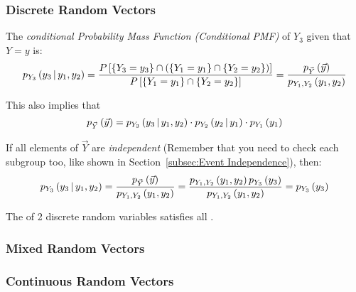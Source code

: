 		\subsubsection{Discrete Random Vectors} \label{subsubsec:Conditional Probability Discrete Random Vectors}
			\begin{definition} \label{def:Discrete Random Vector-Conditional PMF}
				The \emph{conditional Probability Mass Function (Conditional PMF)} of $Y_{3}$ given that $Y=y$ is:
				\begin{equation} \label{eq:Discrete Random Vector-Conditional PMF}
					p_{Y_{3}} \left( y_{3} \operatorname{\vert} y_{1},y_{2} \right)
					= \frac{P \left[ \lbrace Y_{3}=y_{3} \rbrace \cap \left( \lbrace Y_{1}=y_{1} \rbrace \cap \lbrace Y_{2}=y_{2} \rbrace \right) \right]}{P \left[ \lbrace Y_{1}=y_{1} \rbrace \cap \lbrace Y_{2}=y_{2} \rbrace \right]} 
					= \frac{p_{\vec{Y}} \left( \vec{y} \right)}{p_{Y_{1},Y_{2}} \left( y_{1},y_{2} \right)}
				\end{equation}
				\begin{remark}
					This also implies that
					\begin{equation} \label{eq:Discrete Random Vector-Joint PMF}
						p_{\vec{Y}} \left( \vec{y} \right) = p_{Y_{3}} \left( y_{3} \operatorname{\vert} y_{1},y_{2} \right) \cdot p_{Y_{2}} \left( y_{2} \operatorname{\vert} y_{1} \right) \cdot p_{Y_{1}} \left( y_{1} \right)
					\end{equation}
				\end{remark}
				\begin{remark}
					If all elements of $\vec{Y}$ are \emph{independent} (Remember that you need to check each subgroup too, like shown in Section~\ref{subsec:Event Independence}), then:
					\begin{equation} \label{eq:Discrete Random Vector-Independent Conditional PMF}
						p_{Y_{3}} \left( y_{3} \operatorname{\vert} y_{1},y_{2} \right)
						= \frac{p_{\vec{Y}} \left( \vec{y} \right)}{p_{Y_{1},Y_{2}} \left( y_{1},y_{2} \right)}
						= \frac{p_{Y_{1},Y_{2}} \left( y_{1},y_{2} \right) p_{Y_{3}} \left( y_{3} \right)}{p_{Y_{1},Y_{2}} \left( y_{1},y_{2} \right)}
						= p_{Y_{3}} \left( y_{3} \right)
					\end{equation}
				\end{remark}
				\begin{remark}
					The  of 2 discrete random variables satisfies all .
				\end{remark}
			\end{definition}
		
		\subsubsection{Mixed Random Vectors} \label{subsubsec:Conditional Probability Mixed Random Vectors}
		
		
		\subsubsection{Continuous Random Vectors} \label{subsubsec:Conditional Probability Continuous Random Vectors}
		
		
	
	